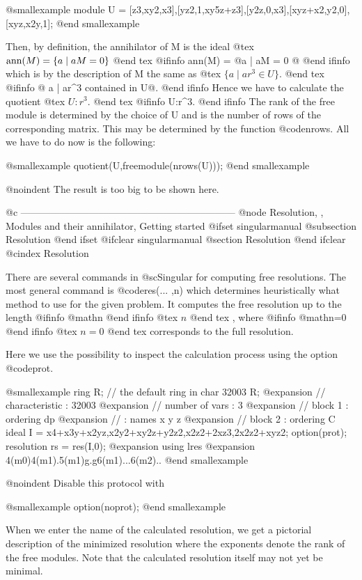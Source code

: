 @smallexample
module U = [z3,xy2,x3],[yz2,1,xy5z+z3],[y2z,0,x3],[xyz+x2,y2,0],[xyz,x2y,1];
@end smallexample

Then, by definition, the annihilator of M is the ideal
@tex
$\hbox{ann}(M) = \{a \mid aM = 0 \}$
@end tex
@ifinfo
ann(M) = @{a | aM = 0 @}
@end ifinfo
which is by the description of M the same as
@tex
$\{ a \mid ar^3 \in U \}$.
@end tex
@ifinfo
@{ a | ar^3 contained in U@}.
@end ifinfo
Hence we have to calculate the quotient
@tex
$U \colon r^3 $.
@end tex
@ifinfo
U:r^3.
@end ifinfo
The rank of the free module is determined by the choice of U and is the
number of rows of the corresponding matrix. This may be determined by
the function @code{nrows}. All we have to do now is the following:

@smallexample
quotient(U,freemodule(nrows(U)));
@end smallexample

@noindent The result is too big to be shown here.

@c ------------------------------------------------------------------
@node Resolution,  , Modules and their annihilator, Getting started
@ifset singularmanual
@subsection Resolution
@end ifset
@ifclear singularmanual
@section Resolution
@end ifclear
@cindex Resolution

There are several commands in @sc{Singular} for computing free resolutions.
The most general command is @code{res(... ,n)} which determines heuristically
what method to use for the given problem. It computes the free resolution
up to the length 
@ifinfo
@math{n}
@end ifinfo
@tex
$n$
@end tex
, where 
@ifinfo
@math{n=0}
@end ifinfo
@tex
$n=0$
@end tex
 corresponds to the full resolution.

Here we use the possibility to inspect the calculation process using the
option @code{prot}.

@smallexample
ring R;      // the default ring in char 32003
R;
@expansion{} //   characteristic : 32003
@expansion{} //   number of vars : 3
@expansion{} //        block   1 : ordering dp
@expansion{} //                  : names    x y z
@expansion{} //        block   2 : ordering C
ideal I = x4+x3y+x2yz,x2y2+xy2z+y2z2,x2z2+2xz3,2x2z2+xyz2;
option(prot);
resolution rs = res(I,0);
@expansion{} using lres
@expansion{} 4(m0)4(m1).5(m1)g.g6(m1)...6(m2)..
@end smallexample

@noindent Disable this protocol with

@smallexample
option(noprot);
@end smallexample

When we enter the name of the calculated resolution, we get a pictorial
description of the minimized resolution where the exponents denote the rank of the
free modules. Note that the calculated resolution itself may not yet be minimal.

